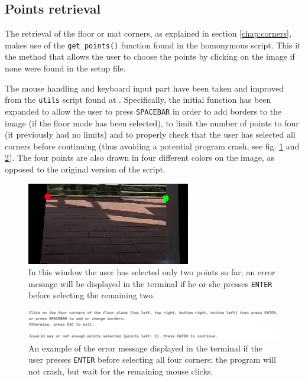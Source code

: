 \documentclass[12pt]{article}
\begin{document}

\subsection{Points retrieval}
\label{chap:points}
The retrieval of the floor or mat corners, as explained in section \ref{chap:corners}, makes use of the \lstinline{get_points()} function found in the homonymous script. This it the method that allows the user to choose the points by clicking on the image if none were found in the setup file.

The mouse handling and keyboard input part have been taken and improved from the \lstinline{utils} script found at \cite{utils}. Specifically, the initial function has been expanded\cite{cookbook} to allow the user to press \lstinline{SPACEBAR}\cite{opencvkeys} in order to add borders to the image (if the floor mode has been selected), to limit the number of points to four (it previously had no limits) and to properly check that the user has selected all corners before continuing (thus avoiding a potential program crash, see fig. \ref{fig:twopoints} and \ref{fig:pointsterminal}). The four points are also drawn in four different colors on the image, as opposed to the original version of the script.

\begin{figure}[H]
\begin{center}
    \includegraphics[width=0.3\linewidth]{img/two_points.jpg}
\end{center}
   \caption{In this window the user has selected only two points so far; an error message will be displayed in the terminal if he or she presses \lstinline{ENTER} before selecting the remaining two.}
\label{fig:twopoints}
\end{figure}

\begin{figure}[H]
\begin{center}
    \includegraphics[height=0.122\linewidth]{img/points_terminal.png}
\end{center}
   \caption{An example of the error message displayed in the terminal if the user presses \lstinline{ENTER} before selecting all four corners; the program will not crash, but wait for the remaining mouse clicks.}
\label{fig:pointsterminal}
\end{figure}
\end{document}
